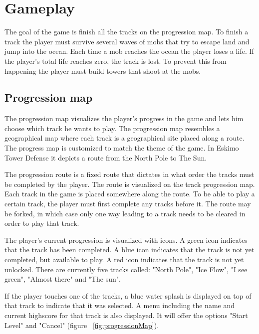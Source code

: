 \section{Gameplay}

The goal of the game is finish all the tracks on the progression map. To finish a track the player must survive several waves of mobs that try to escape land and jump into the ocean. Each time a mob reaches the ocean the player loses a life. If the player's total life reaches zero, the track is lost. To prevent this from happening the player must build towers that shoot at the mobs.

\subsection{Progression map}

The progression map visualizes the player's progress in the game and lets him choose which track he wants to play. The progression map resembles a geographical map where each track is a geographical site placed along a route. The progress map is customized to match the theme of the game. In Eskimo Tower Defense it depicts a route from the North Pole to The Sun.

The progression route is a fixed route that dictates in what order the tracks must be completed by the player. The route is visualized on the track progression map. Each track in the game is placed somewhere along the route. To be able to play a certain track, the player must first complete any tracks before it. The route may be forked, in which case only one way leading to a track needs to be cleared in order to play that track. 

The player's current progression is visualized with icons. A green icon indicates that the track has been completed. A blue icon indicates that the track is not yet completed, but available to play. A red icon indicates that the track is not yet unlocked. There are currently five tracks called: "North Pole", "Ice Flow", "I see green", "Almost there" and "The sun".  

If the player touches one of the tracks, a blue water splash is displayed on top of that track to indicate that it was selected. A menu including the name and current highscore for that track is also displayed. It will offer the options "Start Level" and "Cancel" (figure ~\ref{fig:progressionMap}).

